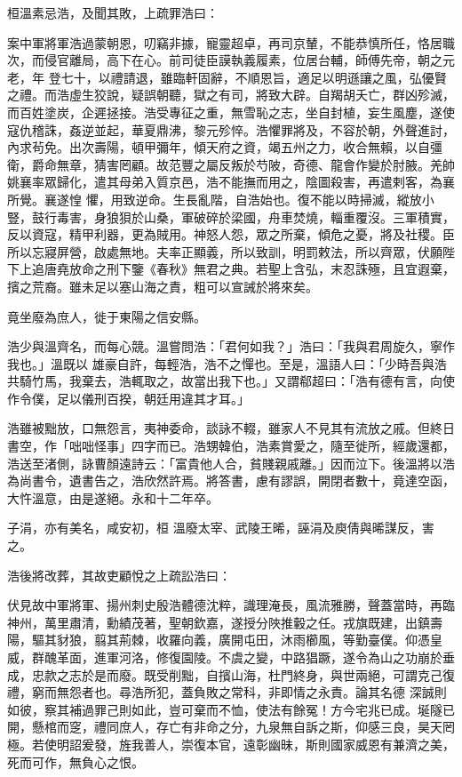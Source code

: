\begin{pinyinscope}
 桓溫素忌浩，及聞其敗，上疏罪浩曰：



 案中軍將軍浩過蒙朝恩，叨竊非據，寵靈超卓，再司京輦，不能恭慎所任，恪居職次，而侵官離局，高下在心。前司徒臣謨執義履素，位居台輔，師傅先帝，朝之元老，年
 登七十，以禮請退，雖臨軒固辭，不順恩旨，適足以明遜讓之風，弘優賢之禮。而浩虛生狡說，疑誤朝聽，獄之有司，將致大辟。自羯胡夭亡，群凶殄滅，而百姓塗炭，企遲拯接。浩受專征之重，無雪恥之志，坐自封植，妄生風塵，遂使寇仇稽誅，姦逆並起，華夏鼎沸，黎元殄悴。浩懼罪將及，不容於朝，外聲進討，內求茍免。出次壽陽，頓甲彌年，傾天府之資，竭五州之力，收合無賴，以自彊衛，爵命無章，猜害罔顧。故范豐之屬反叛於芍陂，奇德、龍會作變於肘腋。羌帥姚襄率眾歸化，遣其母弟入質京邑，浩不能撫而用之，陰圖殺害，再遣剌客，為襄所覺。襄遂惶
 懼，用致逆命。生長亂階，自浩始也。復不能以時掃滅，縱放小豎，鼓行毒害，身狼狽於山桑，軍破碎於梁國，舟車焚燒，輜重覆沒。三軍積實，反以資寇，精甲利器，更為賊用。神怒人怨，眾之所棄，傾危之憂，將及社稷。臣所以忘寢屏營，啟處無地。夫率正顯義，所以致訓，明罰敕法，所以齊眾，伏願陛下上追唐堯放命之刑下鑒《春秋》無君之典。若聖上含弘，末忍誅殛，且宜遐棄，擯之荒裔。雖未足以塞山海之責，粗可以宣誡於將來矣。



 竟坐廢為庶人，徙于東陽之信安縣。



 浩少與溫齊名，而每心競。溫嘗問浩：「君何如我？」浩曰：「我與君周旋久，寧作我也。」溫既以
 雄豪自許，每輕浩，浩不之憚也。至是，溫語人曰：「少時吾與浩共騎竹馬，我棄去，浩輒取之，故當出我下也。」又謂郗超曰：「浩有德有言，向使作令僕，足以儀刑百揆，朝廷用違其才耳。」



 浩雖被黜放，口無怨言，夷神委命，談詠不輟，雖家人不見其有流放之戚。但終日書空，作「咄咄怪事」四字而已。浩甥韓伯，浩素賞愛之，隨至徙所，經歲還都，浩送至渚側，詠曹顏遠詩云：「富貴他人合，貧賤親戚離。」因而泣下。後溫將以浩為尚書令，遺書告之，浩欣然許焉。將答書，慮有謬誤，開閉者數十，竟達空函，大忤溫意，由是遂絕。永和十二年卒。



 子涓，亦有美名，咸安初，桓
 溫廢太宰、武陵王晞，誣涓及庾倩與晞謀反，害之。



 浩後將改葬，其故吏顧悅之上疏訟浩曰：



 伏見故中軍將軍、揚州刺史殷浩體德沈粹，識理淹長，風流雅勝，聲蓋當時，再臨神州，萬里肅清，勳績茂著，聖朝欽嘉，遂授分陜推轂之任。戎旗既建，出鎮壽陽，驅其豺狼，翦其荊棘，收羅向義，廣開屯田，沐雨櫛風，等勤臺僕。仰憑皇威，群醜革面，進軍河洛，修復園陵。不虞之變，中路猖蹶，遂令為山之功崩於垂成，忠款之志於是而廢。既受削黜，自擯山海，杜門終身，與世兩絕，可謂克己復禮，窮而無怨者也。尋浩所犯，蓋負敗之常科，非即情之永責。論其名德
 深誠則如彼，察其補過罪己則如此，豈可棄而不恤，使法有餘冤！方今宅兆已成。埏隧已開，懸棺而窆，禮同庶人，存亡有非命之分，九泉無自訴之斯，仰感三良，昊天罔極。若使明詔爰發，旌我善人，崇復本官，遠彰幽昧，斯則國家威恩有兼濟之美，死而可作，無負心之恨。




\end{pinyinscope}

